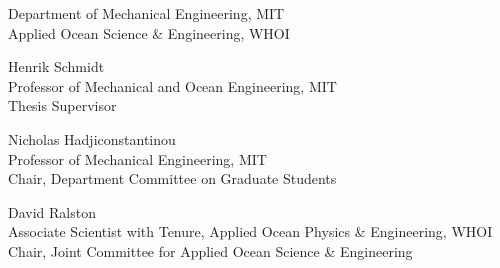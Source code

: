 \begin{titlepage}
\begin{center}
\begin{singlespace}
    \signature{Author}{\footnotesize Department of Mechanical Engineering, MIT \\ Applied Ocean Science \& Engineering, WHOI \\ \@date}
    \vspace{1em}
    \signature{Certified by}{Henrik Schmidt \\ \footnotesize Professor of Mechanical and Ocean Engineering, MIT \\ Thesis Supervisor}
    \vspace{1em}
    \signature{Accepted by}{Nicholas Hadjiconstantinou \\ \footnotesize Professor of Mechanical Engineering, MIT \\ Chair, Department Committee on Graduate Students}
    \vspace{1em}
    \signature{Accepted by}{David Ralston \\ \footnotesize Associate Scientist with Tenure, Applied Ocean Physics \& Engineering, WHOI \\ Chair, Joint Committee for Applied Ocean Science \& Engineering}
    \end{singlespace}
  \end{center}
  \makeatother
\end{titlepage}

\newpage
\null
\thispagestyle{empty}
\newpage